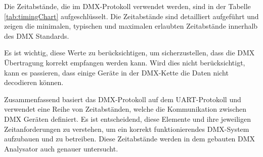 Die Zeitabstände, die im DMX-Protokoll verwendet werden, sind in der Tabelle \ref{tab:timingChart} aufgeschlüsselt. Die Zeitabstände sind detailliert aufgeführt und zeigen die minimalen, typischen und maximalen erlaubten Zeitabstände innerhalb des DMX Standards.

\begin{table}[H]
	\centering
	\caption{Zeitdiagramm \cite[S.18]{DMX512-Protocol-Standard}}
	\label{tab:timingChart}
\end{table}

Es ist wichtig, diese Werte zu berücksichtigen, um sicherzustellen, dass die DMX Übertragung korrekt empfangen werden kann. Wird dies nicht berücksichtigt, kann es passieren, dass einige Geräte in der DMX-Kette die Daten nicht decodieren können.


Zusammenfassend basiert das DMX-Protokoll auf dem UART-Protokoll und verwendet eine Reihe von Zeitabständen, welche die Kommunikation zwischen DMX Geräten definiert. Es ist entscheidend, diese Elemente und ihre jeweiligen Zeitanforderungen zu verstehen, um ein korrekt funktionierendes DMX-System aufzubauen und zu betreiben. Diese Zeitabstände werden in dem gebauten DMX Analysator auch genauer untersucht.

